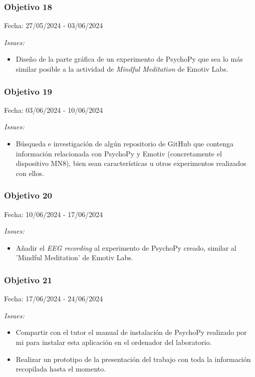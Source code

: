 \subsubsection{Objetivo 18}
Fecha: 27/05/2024 - 03/06/2024

\textit{Issues:}
\begin{itemize}
    \item Diseño de la parte gráfica de un experimento de PsychoPy que sea lo más similar posible a la actividad de \textit{Mindful Meditation} de Emotiv Labs.
\end{itemize}

\subsubsection{Objetivo 19}
Fecha: 03/06/2024 - 10/06/2024

\textit{Issues:}
\begin{itemize}
    \item Búsqueda e investigación de algún repositorio de GitHub que contenga información relacionada con PsychoPy y Emotiv (concretamente el dispositivo MN8), bien sean características u otros experimentos realizados con ellos.
\end{itemize}

\subsubsection{Objetivo 20}
Fecha: 10/06/2024 - 17/06/2024

\textit{Issues:}
\begin{itemize}
    \item Añadir el \textit{EEG recording} al experimento de PsychoPy creado, similar al 'Mindful Meditation' de Emotiv Labs.
\end{itemize}

\subsubsection{Objetivo 21}
Fecha: 17/06/2024 - 24/06/2024

\textit{Issues:}
\begin{itemize}
    \item Compartir con el tutor el manual de instalación de PsychoPy realizado por mi para instalar esta aplicación en el ordenador del laboratorio.
    \item Realizar un prototipo de la presentación del trabajo con toda la información recopilada hasta el momento.
\end{itemize}


